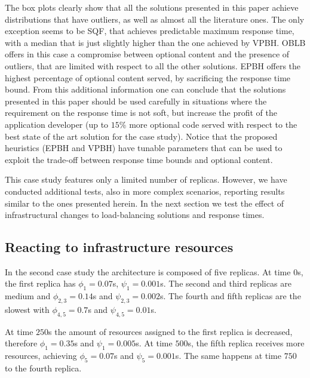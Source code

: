 The box plots clearly show that all the solutions presented in this
paper achieve distributions that have outliers, as well as almost all
the literature ones. The only exception seems to be SQF, that achieves
predictable maximum response time, with a median that is just slightly
higher than the one achieved by VPBH. OBLB offers in this case a
compromise between optional content and the presence of outliers, that
are limited with respect to all the other solutions. EPBH offers the
highest percentage of optional content served, by sacrificing the
response time bound. From this additional information one can conclude that
the solutions presented in this paper should be used carefully in
situations where the requirement on the response time is not soft, but
increase the profit of the application developer (up to $15\%$ more
optional code served with respect to the best state of the art
solution for the case study). Notice that the proposed heuristics
(EPBH and VPBH) have tunable parameters that can be used to exploit
the trade-off between response time bounds and optional content.

This case study features only a limited number of replicas. However,
we have conducted additional tests, also in more complex scenarios,
reporting results similar to the ones presented herein. In the next
section we test the effect of infrastructural changes to
load-balancing solutions and response times.

\subsection{Reacting to infrastructure resources}

In the second case study the architecture is composed of five
replicas. At time $0$s, the first replica has $\phi_1 = 0.07$s,
$\psi_1 = 0.001$s. The second and third replicas are medium and
$\phi_{2,3} = 0.14$s and $\psi_{2,3} = 0.002$s. The fourth and fifth
replicas are the slowest with $\phi_{4,5} = 0.7$s and $\psi_{4,5} =
0.01$s.

At time $250$s the amount of resources assigned to the first replica
is decreased, therefore $\phi_1 = 0.35$s and $\psi_1 = 0.005$s. At
time $500$s, the fifth replica receives more resources, achieving
$\phi_5 = 0.07$s and $\psi_5 = 0.001$s. The same happens at time $750$
to the fourth replica.

